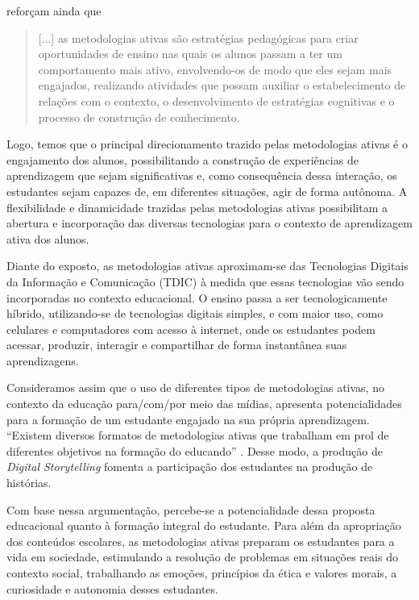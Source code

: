 \documentclass[portuguese]{textolivre}
\begin{document}
\textcite[p.~465]{valente2017metodologias} reforçam ainda que

\begin{quote}
    [...] as metodologias ativas são estratégias pedagógicas para criar oportunidades de ensino nas quais os alunos passam a ter um comportamento mais ativo, envolvendo-os de modo que eles sejam mais engajados, realizando atividades que possam auxiliar o estabelecimento de relações com o contexto, o desenvolvimento de estratégias cognitivas e o processo de construção de conhecimento.
\end{quote}

Logo, temos que o principal direcionamento trazido pelas metodologias ativas é o engajamento dos alunos, possibilitando a construção de experiências de aprendizagem que sejam significativas e, como consequência dessa interação, os estudantes sejam capazes de, em diferentes situações, agir de forma autônoma. A flexibilidade e dinamicidade trazidas pelas metodologias ativas possibilitam a abertura e incorporação das diversas tecnologias para o contexto de aprendizagem ativa dos alunos.

Diante do exposto, as metodologias ativas aproximam-se das Tecnologias Digitais da Informação e Comunicação (TDIC) à medida que essas tecnologias vão sendo incorporadas no contexto educacional. O ensino passa a ser tecnologicamente híbrido, utilizando-se de tecnologias digitais simples, e com maior uso, como celulares e computadores com acesso à internet, onde os estudantes podem acessar, produzir, interagir e compartilhar de forma instantânea suas aprendizagens.

Consideramos assim que o uso de diferentes tipos de metodologias ativas, no contexto da educação para/com/por meio das mídias, apresenta potencialidades para a formação de um estudante engajado na sua própria aprendizagem. “Existem diversos formatos de metodologias ativas que trabalham em prol de diferentes objetivos na formação do educando” \cite[p.~146]{farias2015aprendizagem}. Desse modo, a produção de \textit{Digital Storytelling} fomenta a participação dos estudantes na produção de histórias.

Com base nessa argumentação, percebe-se a potencialidade dessa proposta educacional quanto à formação integral do estudante. Para além da apropriação dos conteúdos escolares, as metodologias ativas preparam os estudantes para a vida em sociedade, estimulando a resolução de problemas em situações reais do contexto social, trabalhando as emoções, princípios da ética e valores morais, a curiosidade e autonomia desses estudantes.
\end{document}
